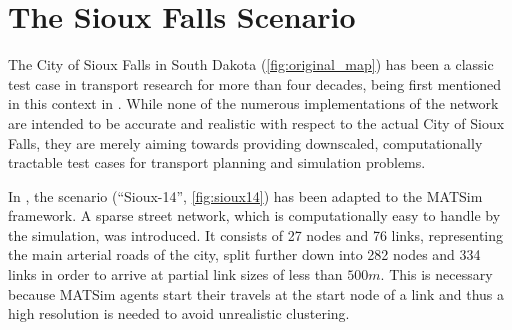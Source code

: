 \section{The Sioux Falls Scenario}
\label{sec:sioux}

The City of Sioux Falls in South Dakota (\cref{fig:original_map}) has been a classic test case in transport
research for more than four decades, being first mentioned in this context in
\citet{Morlok1973}. While none of the numerous implementations of the network are intended to be accurate
and realistic with respect to the actual City of Sioux Falls, they are merely aiming
towards providing downscaled, computationally tractable test cases for transport
planning and simulation problems.

In \citet{Chakirov2014}, the scenario (``Sioux-14'', \cref{fig:sioux14}) has been
adapted to the MATSim framework. A sparse street network, which is computationally
easy to handle by the simulation, was introduced. It consists of 27 nodes and 76 links,
representing the main arterial roads of the city, split further down into
282 nodes and 334 links in order to arrive at partial link sizes of less than $500m$.
This is necessary because MATSim agents start their travels at the start node
of a link and thus a high resolution is needed to avoid unrealistic clustering.

